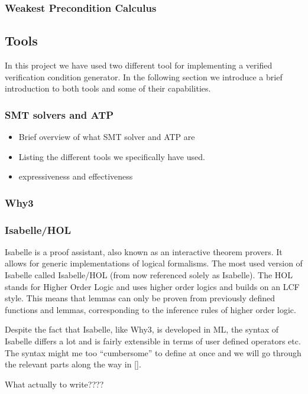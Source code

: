 \subsubsection{Weakest Precondition Calculus}\label{sec:wp}


\subsection{Tools}
In this project we have used two different tool for implementing a verified verification condition generator.
In the following section we introduce a brief introduction to both tools and some of their capabilities.

\subsubsection{SMT solvers and ATP}

\begin{itemize}
  \item Brief overview of what SMT solver and ATP are
  \item Listing the different tools we specifically have used.
  \item expressiveness and effectiveness
\end{itemize}

\subsubsection{Why3}\label{sec:why3}


\subsubsection{Isabelle/HOL}\label{sec:isabelle}
Isabelle is a proof assistant, also known as an interactive theorem provers.
It allows for generic implementations of logical formalisms.
The most used version of Isabelle called Isabelle/HOL (from now referenced solely as Isabelle).
The HOL stands for Higher Order Logic and uses higher order logics and builds on an LCF style.
This means that lemmas can only be proven from previously defined functions and lemmas, corresponding to the inference rules of higher order logic.

Despite the fact that Isabelle, like Why3, is developed in ML, the syntax of Isabelle differs a lot and is fairly extensible in terms of user defined operators etc.
The syntax might me too ``cumbersome'' to define at once and we will go through the relevant parts along the way in \autoref{}.

What actually to write????
